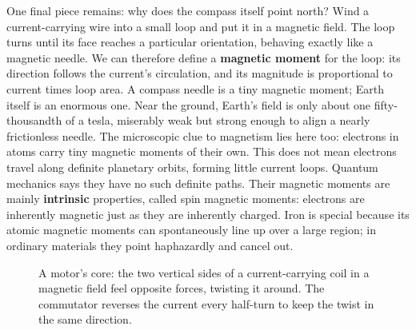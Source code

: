 \begin{mainline}
One final piece remains: why does the compass itself point north? Wind a current-carrying wire into a small loop and put it in a magnetic field. The loop turns until its face reaches a particular orientation, behaving exactly like a magnetic needle. We can therefore define a \textbf{magnetic moment} for the loop: its direction follows the current's circulation, and its magnitude is proportional to current times loop area. A compass needle is a tiny magnetic moment; Earth itself is an enormous one. Near the ground, Earth's field is only about one fifty-thousandth of a tesla, miserably weak but strong enough to align a nearly frictionless needle. The microscopic clue to magnetism lies here too: electrons in atoms carry tiny magnetic moments of their own. This does not mean electrons travel along definite planetary orbits, forming little current loops. Quantum mechanics says they have no such definite paths. Their magnetic moments are mainly \textbf{intrinsic} properties, called spin magnetic moments: electrons are inherently magnetic just as they are inherently charged. Iron is special because its atomic magnetic moments can spontaneously line up over a large region; in ordinary materials they point haphazardly and cancel out.
\end{mainline}

\begin{figure}[htbp]
\centering
{}
\caption{A motor's core: the two vertical sides of a current-carrying coil in a magnetic field feel opposite forces, twisting it around. The commutator reverses the current every half-turn to keep the twist in the same direction.}
\end{figure}

